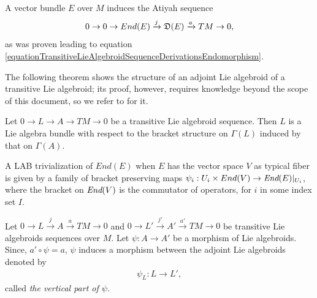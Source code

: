 \begin{example}
A vector bundle $E$ over $M$ induces the Atiyah sequence
\begin{equation}
0 \to 0 \to End(E) \xrightarrow{j} \mathfrak{D}(E)  \xrightarrow{a} TM \to 0,
\end{equation}
 as was proven leading to equation \ref{equationTransitiveLieAlgebroidSequenceDerivationsEndomorphism}.
\end{example}

The following theorem shows the structure of an adjoint Lie algebroid of a transitive Lie algebroid; its proof, however, requires knowledge beyond the scope of this document, so we refer to \cite{Mackenzie2005} for it.
\begin{theorem}\label{theoAdjtructure of ointLAB} %
Let $0 \to L \to A \to  TM \to 0$ be a transitive Lie algebroid sequence. Then $L$ is a Lie algebra bundle with respect to the bracket structure on $\Gamma(L)$ induced by that on $\Gamma(A)$.
\end{theorem}

\begin{example}
A LAB trivialization of $End(E)$ when $E$ has the vector space $V$ as typical fiber is given by a family of bracket preserving maps $\psi_i: U_i \times End(V) \to \operatorname{\textit{End}}(E)|_{U_i}$, where the bracket on $\operatorname{\textit{End}}(V)$ is the commutator of operators, for $i$ in some index set $I$.
\end{example}

\begin{definition}\label{defnPhi+}
Let $0 \to L \xrightarrow{j} A \xrightarrow{a} TM \to 0$ and $0 \to L' \xrightarrow{j'} A' \xrightarrow{a'} TM \to 0$ be transitive Lie algebroids sequences over $M$. Let $\psi: A \to A'$ be a morphism of Lie algebroids. Since, $a' \circ \psi = a$, $\psi$ induces a morphism between the adjoint Lie algebroids denoted by
\begin{align*}
    \psi_L: L \to L',
\end{align*}
called \emph{the vertical part of $\psi$}.
\end{definition}

